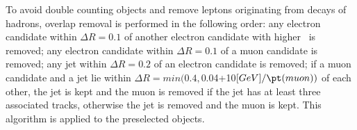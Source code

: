 To avoid double counting objects and remove leptons originating from decays of hadrons, overlap removal is performed in the following order: any electron candidate within $\Delta R = 0.1$ of another electron candidate with higher \pt\ is removed; any electron candidate within $\Delta R = 0.1$ of a muon candidate is removed; any jet within $\Delta R = 0.2$ of an electron candidate is removed; if a muon candidate and a jet lie within $\Delta R = min(0.4, $0.04+10$[GeV]/\pt(muon))$ of each other, the jet is kept and the muon is removed if the jet has at least three associated tracks, otherwise the jet is removed and the muon is kept. This algorithm is applied to the preselected objects. 


